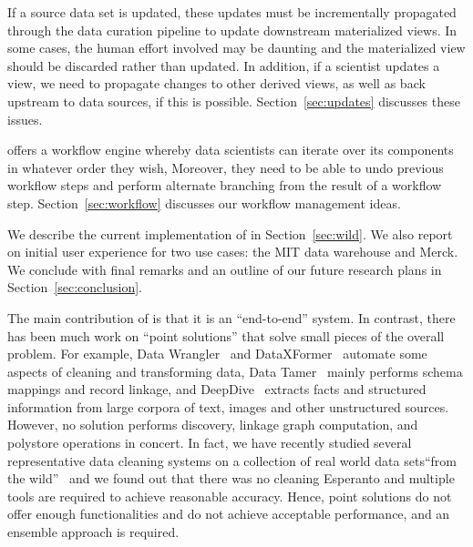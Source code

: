 \stitle{[Updates.]}  
If a source data set is updated, these updates must be incrementally propagated through the data curation pipeline to update downstream materialized views. 
In some cases, the human effort involved may be daunting and the materialized view should be discarded rather than updated. 
In addition, if a scientist updates a view, we need to propagate changes to other derived views, as well as back upstream to data sources, if this is possible. Section~\ref{sec:updates} discusses these  issues.



\stitle{[Workflow.]} 
\dcv offers a workflow engine whereby data scientists can iterate over its components in whatever order they wish,  Moreover, they need to be able to undo previous workflow steps and perform alternate branching from the result of a workflow step.  Section~\ref{sec:workflow} discusses our workflow management ideas.

\smallskip

We describe the current implementation of \dcv in Section~\ref{sec:wild}. We also report on initial user experience for two use cases: the MIT data warehouse and Merck. We conclude with final remarks and an outline of our future research plans in Section~\ref{sec:conclusion}.

\smallskip
The main contribution of \dcv is that it is an ``end-to-end'' system. In contrast, there has been much work on ``point solutions'' that solve small pieces of the overall problem. 
For example, 
Data Wrangler~\cite{2011-wrangler} and DataXFormer~\cite{DBLP:conf/icde/AbedjanMIOPS16} automate some aspects of cleaning and transforming data,  Data Tamer~\cite{DBLP:conf/cidr/StonebrakerBIBCZPX13} mainly performs schema mappings and record linkage,
and  DeepDive~\cite{DBLP:journals/pvldb/ShinWWSZR15} extracts facts and structured information from large corpora of text, images and other unstructured sources. 
However, no solution performs  discovery, linkage graph computation, and polystore operations in concert.
In fact, we have recently studied several representative data cleaning systems on a collection of real world data sets``from the wild''~\cite{DBLP:journals/pvldb/AbedjanCDFIOPST16} and we found out that there was no cleaning Esperanto and multiple tools are required to achieve reasonable accuracy.  
Hence, point solutions do not offer enough functionalities and do not achieve acceptable performance, 
and an ensemble approach is required.

